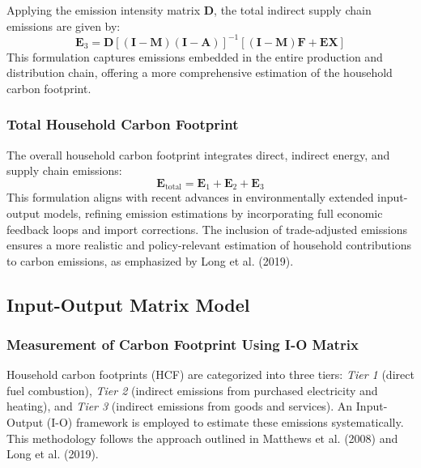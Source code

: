 \documentclass[12pt,a4paper]{article}%
\begin{document}
Applying the emission intensity matrix \( \mathbf{D} \), the total indirect supply chain emissions are given by:
\begin{equation}
    \mathbf{E}_3 = \mathbf{D} [(\mathbf{I} - \mathbf{M}) (\mathbf{I} - \mathbf{A})]^{-1} [(\mathbf{I} - \mathbf{M}) \mathbf{F} + \mathbf{EX}]
\end{equation}
This formulation captures emissions embedded in the entire production and distribution chain, offering a more comprehensive estimation of the household carbon footprint.

\subsubsection*{Total Household Carbon Footprint}
The overall household carbon footprint integrates direct, indirect energy, and supply chain emissions:
\begin{equation}
    \mathbf{E}_{\text{total}} = \mathbf{E}_1 + \mathbf{E}_2 + \mathbf{E}_3
\end{equation}
This formulation aligns with recent advances in environmentally extended input-output models, refining emission estimations by incorporating full economic feedback loops and import corrections. The inclusion of trade-adjusted emissions ensures a more realistic and policy-relevant estimation of household contributions to carbon emissions, as emphasized by Long et al. (2019).
\subsection{Input-Output Matrix Model}

\subsubsection*{Measurement of Carbon Footprint Using I-O Matrix}

Household carbon footprints (HCF) are categorized into three tiers: \textit{Tier 1} (direct fuel combustion), \textit{Tier 2} (indirect emissions from purchased electricity and heating), and \textit{Tier 3} (indirect emissions from goods and services). An Input-Output (I-O) framework is employed to estimate these emissions systematically. This methodology follows the approach outlined in Matthews et al. (2008) and Long et al. (2019).
\end{document}
